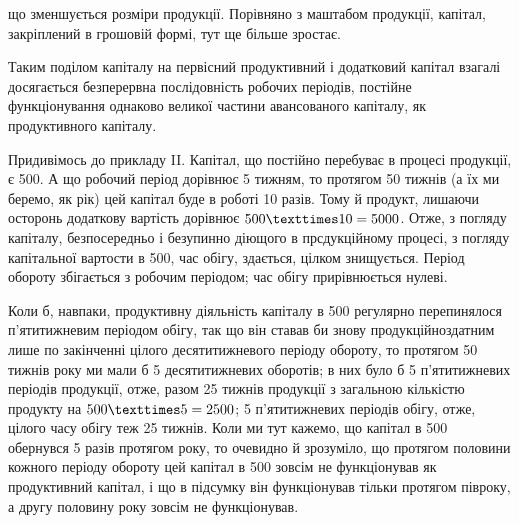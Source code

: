 \parcont{}  %
що зменшується розміри продукції. Порівняно з маштабом продукції, капітал,
закріплений в грошовій формі, тут ще більше зростає.

Таким поділом капіталу на первісний продуктивний і додатковий капітал
взагалі досягається безперервна послідовність робочих періодів, постійне
функціонування однаково великої частини авансованого капіталу,
як продуктивного капіталу.

Придивімось до прикладу II. Капітал, що постійно перебуває в процесі
продукції, є 500. А що робочий період дорівнює 5 тижням,
то протягом 50 тижнів (а їх ми беремо, як рік) цей капітал буде в
роботі 10 разів. Тому й продукт, \textendash{} лишаючи осторонь додаткову вартість
\textendash{} дорівнює $500 × 10 \deq{} 5000$. Отже, з погляду капіталу,
безпосередньо і безупинно діющого в прсдукційному процесі, \textendash{} з погляду
капітальної вартости в 500, \textendash{} час обігу, здається, цілком
знищується. Період обороту збігається з робочим періодом; час обігу прирівнюється
нулеві.

Коли б, навпаки, продуктивну діяльність капіталу в 500 регулярно
перепинялося п’ятитижневим періодом обігу, так що він ставав
би знову продукційноздатним лише по закінченні цілого десятитижневого
періоду обороту, то протягом 50 тижнів року ми мали б 5 десятитижневих
оборотів; в них було б 5 п’ятитижневих періодів продукції, отже,
разом 25 тижнів продукції з загальною кількістю продукту на $500 × 5 \deq{} 2500$; 5 п’ятитижневих періодів обігу, отже, цілого часу обігу теж
25 тижнів. Коли ми тут кажемо, що капітал в 500 обернувся
5 разів протягом року, то очевидно й зрозуміло, що протягом половини
кожного періоду обороту цей капітал в 500 зовсім не функціонував
як продуктивний капітал, і що в підсумку він функціонував тільки
протягом півроку, а другу половину року зовсім не функціонував.

